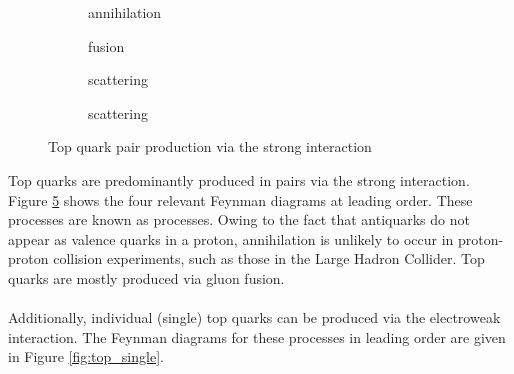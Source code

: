 \begin{figure}[h]
    \centering
    \begin{subfigure}{.2\textwidth}
        \centering
        
        \caption{\qqbar annihilation}
        \label{fig:top_pair_qqbar}
    \end{subfigure}\hfill
    \begin{subfigure}{.2\textwidth}
        \centering
        
        \caption{\PgluonNOSPACE\Pgluon fusion}
        \label{fig:top_pair_gg}
    \end{subfigure}\hfill
    \begin{subfigure}{.2\textwidth}
        \centering
        
        \caption{\PgluonNOSPACE\Pgluon scattering}
        \label{fig:top_pair_gg_scatter}
    \end{subfigure}\hfill
    \begin{subfigure}{.2\textwidth}
        \centering
        
        \caption{\PgluonNOSPACE\Pgluon scattering}
        \label{fig:top_pair_gg_scatter_t}
    \end{subfigure}
    \caption{Top quark pair production via the strong interaction}
    \label{fig:top_pair}
\end{figure}

Top quarks are predominantly produced in pairs via the strong interaction. Figure \ref{fig:top_pair} shows the four relevant Feynman diagrams at leading order. These processes are known as \ttbar processes. Owing to the fact that antiquarks do not appear as valence quarks in a proton, \qqbar annihilation is unlikely to occur in proton-proton collision experiments, such as those in the Large Hadron Collider. Top quarks are mostly produced via gluon fusion.\\ \\
Additionally, individual (single) top quarks can be produced via the electroweak interaction. The Feynman diagrams for these processes in leading order are given in Figure \ref{fig:top_single}.


